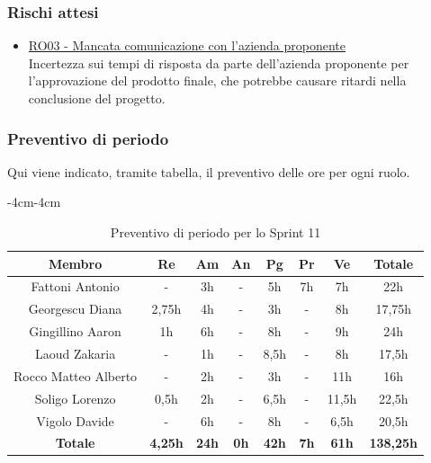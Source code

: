 \documentclass[a4paper,12pt]{article}
\begin{document}
\subsubsection{Rischi attesi}
\begin{itemize}
    \item \hyperref[RO03]{RO03 - Mancata comunicazione con l'azienda proponente} \\Incertezza sui tempi di risposta da parte dell'azienda proponente per l'approvazione del prodotto finale, che potrebbe causare ritardi nella conclusione del progetto.
\end{itemize}

\subsubsection{Preventivo di periodo}
Qui viene indicato, tramite tabella, il preventivo delle ore per ogni ruolo.

\begin{table}[H]
    \begin{adjustwidth}{-4cm}{-4cm}
    \centering
    \begin{tabular}{|c|c|c|c|c|c|c|c|}
        \hline
        \textbf{Membro} & \textbf{Re} & \textbf{Am} & \textbf{An} & \textbf{Pg} & \textbf{Pr} & \textbf{Ve} & \textbf{Totale} \\
        \hline
        Fattoni Antonio & - & 3h & - & 5h & 7h & 7h & 22h \\
        \hline
        Georgescu Diana & 2,75h & 4h & - & 3h & - & 8h & 17,75h \\
        \hline
        Gingillino Aaron & 1h & 6h & - & 8h & - & 9h & 24h \\
        \hline
        Laoud Zakaria & - & 1h & - & 8,5h & - & 8h & 17,5h \\
        \hline
        Rocco Matteo Alberto & - & 2h & - & 3h & - & 11h & 16h \\
        \hline
        Soligo Lorenzo & 0,5h & 2h & - & 6,5h & - & 11,5h & 22,5h \\
        \hline
        Vigolo Davide & - & 6h & - & 8h & - & 6,5h & 20,5h \\
        \hline
        \textbf{Totale} & \textbf{4,25h} & \textbf{24h} & \textbf{0h} & \textbf{42h} & \textbf{7h} & \textbf{61h} & \textbf{138,25h} \\
        \hline
    \end{tabular}
    \caption{Preventivo di periodo per lo Sprint 11}
    \end{adjustwidth}
\end{table}
\end{document}
